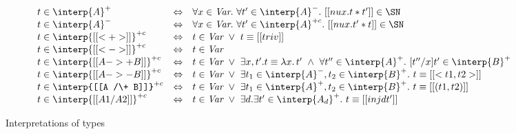 \begin{figure}
\[
\begin{array}{lll}
t \in \interp{A}^+ & \Leftrightarrow & \forall x \in \textit{Var}.\ \forall t'\in\interp{A}^-.\ [[ nu x . t * t' ]] \in \SN\\
t \in \interp{A}^- & \Leftrightarrow & \forall x \in \textit{Var}.\ \forall t'\in\interp{A}^{+c}.\ [[ nu x . t' * t ]] \in \SN\\
t \in \interp{[[< + >]]}^{+c} & \Leftrightarrow & t \in \textit{Var}\ \vee\ t \equiv [[triv]] \\
t \in \interp{[[< - >]]}^{+c} & \Leftrightarrow & t \in \textit{Var}\\
t \in \interp{[[A ->+ B]]}^{+c} & \Leftrightarrow & t \in \textit{Var}\ \vee\ \exists x, t'. t \equiv \lambda x.\, t'\ \wedge\ \forall t''\in\interp{A}^+.\ [t''/x] t'\in\interp{B}^+\\
t \in \interp{[[A ->- B]]}^{+c} & \Leftrightarrow & t \in \textit{Var}\ \vee\ \exists t_1\in\interp{A}^-, t_2\in\interp{B}^+.\ t \equiv [[ < t1 , t2 >]] \\
t \in \interp{[[A /\+ B]]}^{+c} & \Leftrightarrow & t \in \textit{Var}\ \vee\ \exists t_1\in\interp{A}^+, t_2\in\interp{B}^+.\ t \equiv [[ ( t1 , t2 )]] \\
t \in \interp{[[A1 /\- A2]]}^{+c} & \Leftrightarrow & t \in \textit{Var}\ \vee\ \exists d. \exists t'\in\interp{A_d}^+.\ t \equiv [[ inj d t']] 
\end{array}
\]
\caption{Interpretations of types}
\label{fig:classreal}
\end{figure}


